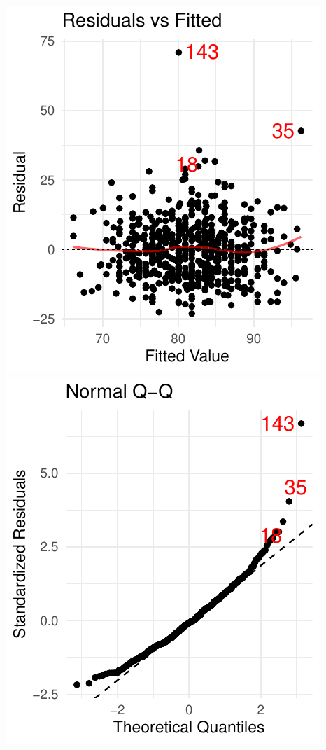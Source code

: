 \documentclass[twoside]{book}\usepackage[]{graphicx}\usepackage[]{xcolor}
\makeatletter
\def\maxwidth{ %
  \ifdim\Gin@nat@width>\linewidth
    \linewidth
  \else
    \Gin@nat@width
  \fi
}
\newenvironment{knitrout}{}{} %
\makeatother
\begin{document}
\begin{solution}
\begin{enumerate}
\begin{knitrout}
{\centering \includegraphics[width=\maxwidth]{figures/fig-unnamed-chunk-236-1} 
\includegraphics[width=\maxwidth]{figures/fig-unnamed-chunk-236-2} 

}
\end{knitrout}
\end{enumerate}
\end{solution}
\end{document}
